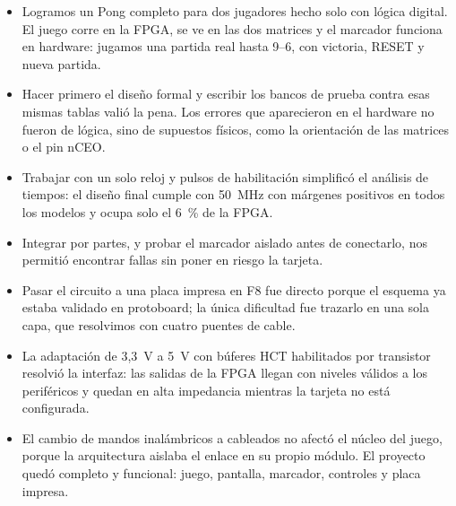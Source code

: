 \documentclass[conference,a4paper]{IEEEtran}
\begin{document}
\begin{itemize}
\item Logramos un Pong completo para dos jugadores hecho solo con lógica digital. El juego corre en la FPGA, se ve en las dos matrices y el marcador funciona en hardware: jugamos una partida real hasta 9--6, con victoria, RESET y nueva partida.
\item Hacer primero el diseño formal y escribir los bancos de prueba contra esas mismas tablas valió la pena. Los errores que aparecieron en el hardware no fueron de lógica, sino de supuestos físicos, como la orientación de las matrices o el pin nCEO.
\item Trabajar con un solo reloj y pulsos de habilitación simplificó el análisis de tiempos: el diseño final cumple con 50~MHz con márgenes positivos en todos los modelos y ocupa solo el 6~\% de la FPGA.
\item Integrar por partes, y probar el marcador aislado antes de conectarlo, nos permitió encontrar fallas sin poner en riesgo la tarjeta.
\item Pasar el circuito a una placa impresa en F8 fue directo porque el esquema ya estaba validado en protoboard; la única dificultad fue trazarlo en una sola capa, que resolvimos con cuatro puentes de cable.
\item La adaptación de 3,3~V a 5~V con búferes HCT habilitados por transistor resolvió la interfaz: las salidas de la FPGA llegan con niveles válidos a los periféricos y quedan en alta impedancia mientras la tarjeta no está configurada.
\item El cambio de mandos inalámbricos a cableados no afectó el núcleo del juego, porque la arquitectura aislaba el enlace en su propio módulo. El proyecto quedó completo y funcional: juego, pantalla, marcador, controles y placa impresa.
\end{itemize}
\end{document}
